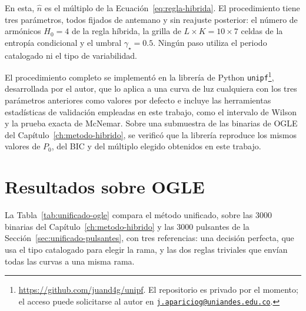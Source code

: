\documentclass[12pt,letterpaper,oneside]{book}
\begin{document}
En esta, $\hat n$ es el m\'ultiplo de la Ecuaci\'on~\eqref{eq:regla-hibrida}. El procedimiento tiene tres par\'ametros, todos fijados de antemano y sin reajuste posterior: el n\'umero de arm\'onicos $H_0=4$ de la regla h\'ibrida, la grilla de $L\times K=10\times7$ celdas de la entrop\'ia condicional y el umbral $\gamma_\star=0.5$. Ning\'un paso utiliza el periodo catalogado ni el tipo de variabilidad.

El procedimiento completo se implement\'o en la librer\'ia de Python \texttt{unipf}\footnote{\url{https://github.com/juand4g/unipf}. El repositorio es privado por el momento; el acceso puede solicitarse al autor en \href{mailto:j.apariciog@uniandes.edu.co}{\nolinkurl{j.apariciog@uniandes.edu.co}}.}, desarrollada por el autor, que lo aplica a una curva de luz cualquiera con los tres par\'ametros anteriores como valores por defecto e incluye las herramientas estad\'isticas de validaci\'on empleadas en este trabajo, como el intervalo de Wilson y la prueba exacta de McNemar. Sobre una submuestra de las binarias de OGLE del Cap\'itulo~\ref{ch:metodo-hibrido}, se verific\'o que la librer\'ia reproduce los mismos valores de $P_0$, del BIC y del m\'ultiplo elegido obtenidos en este trabajo.

\section{Resultados sobre OGLE}
\label{sec:unificado-resultados}

La Tabla~\ref{tab:unificado-ogle} compara el m\'etodo unificado, sobre las 3000 binarias del Cap\'itulo~\ref{ch:metodo-hibrido} y las 3000 pulsantes de la Secci\'on~\ref{sec:unificado-pulsantes}, con tres referencias: una decisi\'on perfecta, que usa el tipo catalogado para elegir la rama, y las dos reglas triviales que env\'ian todas las curvas a una misma rama.
\end{document}
